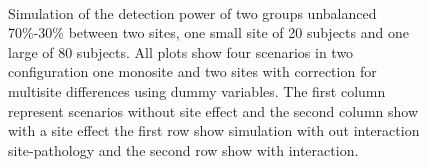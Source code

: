 \documentclass[authoryear]{elsarticle}
\begin{document}
\begin{figure}[t]
     \\
     \tiny Simulation of the detection power of two groups unbalanced 70\%-30\% between two sites, one small site of 20 subjects and one large of 80 subjects. All plots show four scenarios in two configuration one monosite and two sites with correction for multisite differences using dummy variables. The first column represent scenarios without site effect and the second column show with a site effect the first row show simulation with out interaction site-pathology and the second row show with interaction.
     \label{fig_full_sim_2sites_debalancing}
 \end{figure}
 
 
\end{document}
